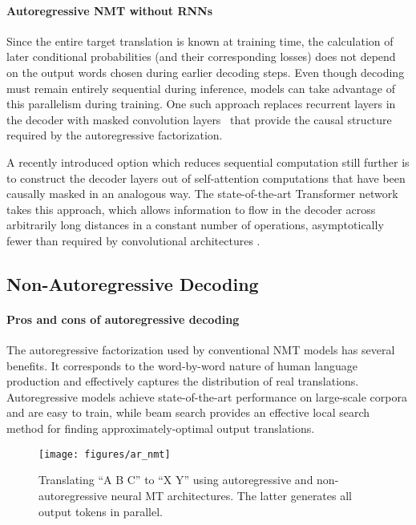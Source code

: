 \documentclass{article} \usepackage{iclr2018_conference,times}
\begin{document}
\vspace{-5pt}
\paragraph{Autoregressive NMT without RNNs}
Since the entire target translation is known at training time, the calculation of later conditional probabilities (and their corresponding losses) does not depend on the output words chosen during earlier decoding steps. Even though decoding must remain entirely sequential during inference, models can take advantage of this parallelism during training.
One such approach replaces recurrent layers in the decoder with masked convolution layers~\citep{kalchbrenner2016neural, gehring2017convolutional} that provide the causal structure required by the autoregressive factorization.

A recently introduced option which reduces sequential computation still further is to construct the decoder layers out of self-attention computations that have been causally masked in an analogous way.
The state-of-the-art Transformer network takes this approach, which allows information to flow in the decoder across arbitrarily long distances in a constant number of operations, asymptotically fewer than required by convolutional architectures \citep{vaswani2017attention}.

\subsection{Non-Autoregressive Decoding}
\vspace{-5pt}
\paragraph{Pros and cons of autoregressive decoding}
The autoregressive factorization used by conventional NMT models has several benefits. It corresponds to the word-by-word nature of human language production and effectively captures the distribution of real translations. Autoregressive models achieve state-of-the-art performance on large-scale corpora and are easy to train, while beam search provides an effective local search method for finding approximately-optimal output translations.

\begin{wrapfigure}{r}{0.35\textwidth} 
\vspace{-10pt}
\centering
\texttt{[image: figures/ar\_nmt]}
\caption{\label{fig.ar_vs_nar} Translating ``A B C'' to ``X Y'' using autoregressive and non-autoregressive neural MT architectures. The latter generates all output tokens in parallel.}\vspace{-20pt}
\end{wrapfigure}
\end{document}
